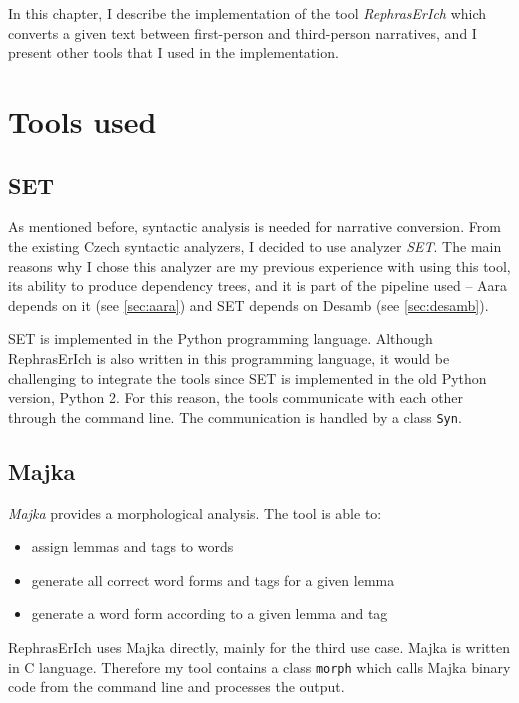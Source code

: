 In this chapter, I describe the implementation of the tool \emph{RephrasErIch} which converts a given text between first-person and third-person narratives, and I present other tools that I used in the implementation.

\section{Tools used} \label{sec:external-tools}

\subsection{SET}

As mentioned before, syntactic analysis is needed for narrative conversion. From the existing Czech syntactic analyzers, I decided to use analyzer \emph{SET}. The main reasons why I chose this analyzer are my previous experience with using this tool, its ability to produce dependency trees, and it is part of the pipeline used -- Aara depends on it (see \ref{sec:aara}) and SET depends on Desamb (see \ref{sec:desamb}).

SET is implemented in the Python programming language. Although RephrasErIch is also written in this programming language, it would be challenging to integrate the tools since SET is implemented in the old Python version, Python 2. For this reason, the tools communicate with each other through the command line. The communication is handled by a class \texttt{Syn}.

\subsection{Majka}

\emph{Majka} \cite{majka} provides a morphological analysis. The tool is able to:
\begin{itemize}
	\item assign lemmas and tags to words
	\item generate all correct word forms and tags for a given lemma
	\item generate a word form according to a given lemma and tag
\end{itemize}

RephrasErIch uses Majka directly, mainly for the third use case. Majka is written in C language. Therefore my tool contains a class \texttt{morph} which calls Majka binary code from the command line and processes the output.


